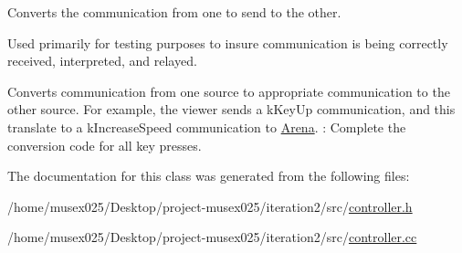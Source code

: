 Converts the communication from one to send to the other. 

Used primarily for testing purposes to insure communication is being correctly received, interpreted, and relayed.

Converts communication from one source to appropriate communication to the other source. For example, the viewer sends a k\+Key\+Up communication, and this translate to a k\+Increase\+Speed communication to \hyperlink{classArena}{Arena}. \+: Complete the conversion code for all key presses. 

The documentation for this class was generated from the following files\+:\begin{DoxyCompactItemize}
\item 
/home/musex025/\+Desktop/project-\/musex025/iteration2/src/\hyperlink{controller_8h}{controller.\+h}\item 
/home/musex025/\+Desktop/project-\/musex025/iteration2/src/\hyperlink{controller_8cc}{controller.\+cc}\end{DoxyCompactItemize}
